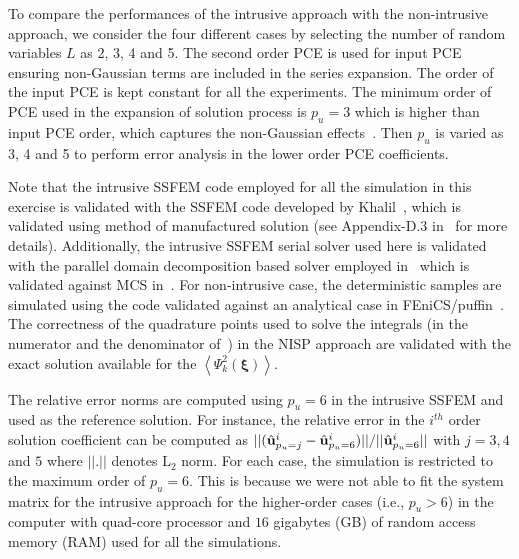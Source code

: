 \documentclass[letter,1p,11pt,oneside,onecolumn,sort&compress]{elsarticle}
\begin{document}
To compare the performances of the intrusive approach with the non-intrusive approach, we consider the four different cases by selecting the number of random variables $L$ as 2, 3, 4 and 5. The second order PCE is used for input PCE ensuring non-Gaussian terms are included in the series expansion. The order of the input PCE is kept constant for all the experiments.
The minimum order of PCE used in the expansion of solution process is $p_{u} = 3$ which is higher than input PCE order, which captures the non-Gaussian effects~\cite{ghanem1999ingredients,ghanem1999stochastic}. Then $p_{u}$ is varied as 3, 4 and 5 to perform error analysis in the lower order PCE coefficients.

Note that the intrusive SSFEM code employed for all the simulation in this exercise is validated with the SSFEM code developed by Khalil~\cite{khalil2013bayesian}, which is validated using method of manufactured solution (see Appendix-D.3 in~\cite{khalil2013bayesian} for more details). Additionally, the intrusive SSFEM serial solver used here is validated with the parallel domain decomposition based solver employed in~\cite{desai2017scalable} %
which is validated against MCS in~\cite{desai2019scalable}. %
For non-intrusive case, the deterministic samples are simulated using the
code validated against an analytical case in FEniCS/puffin~\cite{logg2012FEniCS,aloggs2013puffin}. The correctness of the quadrature points used to solve the integrals (in the numerator and the denominator of~) in the NISP approach are validated with the exact solution available for the ${\left<{\Psi_k^2({\pmb{\xi}})}  \right>}$. %

The relative error norms are computed using $p_{u} = 6$ in the intrusive SSFEM and used as the reference solution. For instance, the relative error in the $i^{th}$ order solution coefficient can be computed as $||({\mathrm{\hat{\bf{u}}}^{i}_{p_{u}=j}} -{\mathrm{\hat{\bf{u}}}^{i}_{p_{u}=6}} )|| /||{\mathrm{\hat{\bf{u}}}^{i}_{p_{u}=6}}||$
with $j=3,4$ and $5$ where $||.||$ denotes $\mathrm{L_2}$ norm. For each case, the simulation is restricted to the maximum order of $p_{u}= 6$. This is because we were not able to fit the system matrix for the intrusive approach for the higher-order cases (i.e., $p_{u} > 6$) in the computer with quad-core processor and $16$ gigabytes (GB) of random access memory (RAM) used for all the simulations.
\end{document}
